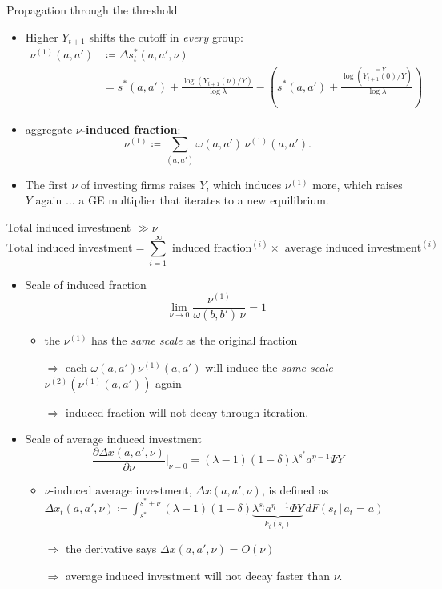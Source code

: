 \documentclass[9pt]{beamer}
\begin{document}
\begin{frame}{Propagation through the threshold}
	\vspace{0.5em}
	\begin{itemize}
		\item Higher $Y_{t+1}$ shifts the cutoff in \emph{every} group:
		\[
		\begin{aligned}
			\nu^{(1)}(a, a') 
			&\coloneq \Delta s^{*}_t(a,a',\nu)\\
			&=s^*(a, a') + \frac{\log (Y_{t+1}(\nu)/ Y)}{\log\lambda} - \left(s^*(a, a') + \frac{\log (\overset{=Y}{Y_{t+1}(0)}/ Y)}{\log\lambda}\right)
		\end{aligned}
		\]
		\item aggregate \textbf{$\nu$-induced fraction}:
		\[
			\nu^{(1)}\coloneq \sum_{(a,a')}\omega(a,a')\,\nu^{(1)}(a, a').
		\]
		\item The first $\nu$ of investing firms raises $Y$, which induces $\nu^{(1)}$ more, which raises $Y$ again $\dots$ a GE multiplier that iterates to a new equilibrium.
	\end{itemize}
\end{frame}

\begin{frame}{Total induced investment $\gg \nu$}
	$$\text{Total induced investment} = \sum_{i=1}^{\infty} \text{ induced fraction}^{(i)} \times \text{ average induced investment}^{(i)}$$

	\begin{itemize}
		\item Scale of induced fraction
		\[
		 \lim_{\nu\to 0}\frac{\nu^{(1)}}{\omega(b,b')\,\nu}=1\
		\]
		\begin{itemize}
			\small
			\item the $\nu^{(1)}$ has the \emph{same scale} as the original fraction 
			
			$\Rightarrow$ each $\omega(a, a') \nu^{(1)}(a, a')$ will induce the \emph{same scale} $\nu^{(2)}(\nu^{(1)}(a, a'))$ again 
		
			$\Rightarrow$ induced fraction will not decay through iteration.
		\end{itemize}

		\item Scale of average induced investment
		\[
			\frac{\partial \Delta x(a, a', \nu)}{\partial \nu}\Big|_{\nu=0} = (\lambda - 1)(1-\delta) \lambda^{s^*} a^{\eta - 1}\Psi Y
		\]
		\begin{itemize}
			\small
			\item $\nu$-induced average investment, $\Delta x(a, a', \nu)$, is defined as $\Delta x_t(a, a', \nu) \coloneq \int_{s^*}^{s^*+\nu} (\lambda - 1)(1-\delta) \underbrace{\lambda^{s_t} a^{\eta-1}\Phi Y}_{k_t(s_t)} \, d F(s_t\,|\, a_t = a)$
			
			$\Rightarrow$ the derivative says $\Delta x(a, a', \nu) = O(\nu)$
			
			$\Rightarrow$ average induced investment will not decay faster than $\nu$.
		\end{itemize}
	\end{itemize}
\end{frame}
\end{document}
